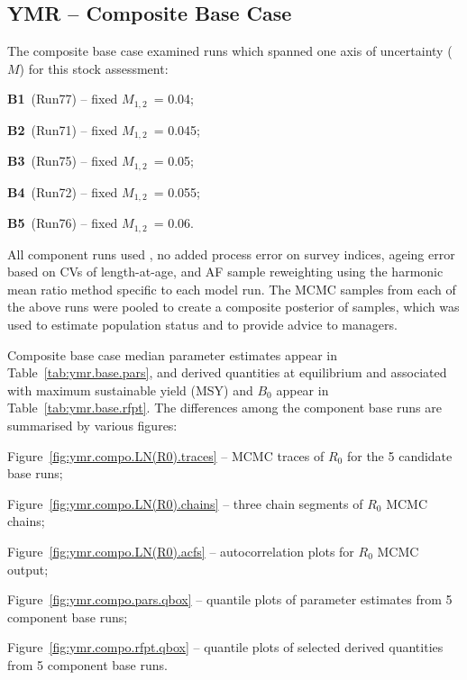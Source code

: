 \documentclass[11pt]{book}
\begin{document}
\graphicspath{{C:/Users/haighr/Files/GFish/PSARC21/YMR/Data/SS/YMR2021/Run75/MCMC.75.01.nuts4K/}}

\subsection{YMR -- Composite Base Case}


The composite base case examined  runs which spanned one axis of uncertainty ($M$) for this stock assessment:
\vspace{-0.5\baselineskip}%
\begin{itemize_csas} 
\item \textbf{B1}~(Run77) -- fixed $M_{1,2}$~= 0.04;
\item \textbf{B2}~(Run71) -- fixed $M_{1,2}$~= 0.045;
\item \textbf{B3}~(Run75) -- fixed $M_{1,2}$~= 0.05;
\item \textbf{B4}~(Run72) -- fixed $M_{1,2}$~= 0.055;
\item \textbf{B5}~(Run76) -- fixed $M_{1,2}$~= 0.06.
\end{itemize_csas}

All component runs used , no added process error on survey indices, ageing error based on CVs of length-at-age, and AF sample reweighting using the harmonic mean ratio method specific to each model run.
The \Nmcmc{} MCMC samples from each of the above runs were pooled to create a composite posterior of \Nbase{} samples, which was used to estimate population status and to provide advice to managers.

Composite base case median parameter estimates appear in Table~\ref{tab:ymr.base.pars}, and derived quantities at equilibrium and associated with maximum sustainable yield (MSY) and $B_0$ appear in Table~\ref{tab:ymr.base.rfpt}.
The differences among the component base runs are summarised by various figures:
\vspace{-0.5\baselineskip}%
\begin{itemize_csas}
  \item Figure~\ref{fig:ymr.compo.LN(R0).traces} -- MCMC traces of $R_0$ for the 5 candidate base runs;
  \item Figure~\ref{fig:ymr.compo.LN(R0).chains} -- three chain segments of $R_0$ MCMC chains;
  \item Figure~\ref{fig:ymr.compo.LN(R0).acfs}   -- autocorrelation plots for $R_0$ MCMC output;
  \item Figure~\ref{fig:ymr.compo.pars.qbox} -- quantile plots of parameter estimates from 5 component base runs;
  \item Figure~\ref{fig:ymr.compo.rfpt.qbox} -- quantile plots of selected derived quantities from 5 component base runs.
\end{itemize_csas}
\end{document}
